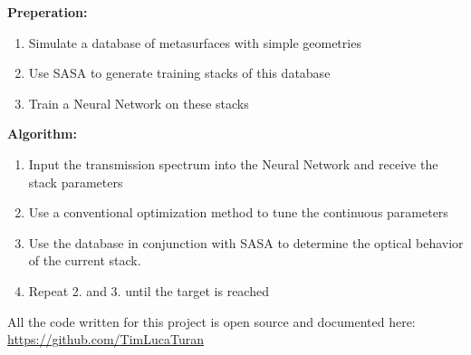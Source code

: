 \textbf{Preperation:}
\begin{enumerate}
    \item Simulate a database of metasurfaces with simple geometries

    \item Use SASA to generate training stacks of this database

    \item Train a Neural Network on these stacks
\end{enumerate}

\textbf{Algorithm:}
\begin{enumerate}
    \item Input the transmission spectrum into the Neural Network and receive the stack parameters

    \item Use a conventional optimization method to tune the continuous parameters

    \item Use the database in conjunction with SASA to determine the optical behavior of the current stack.

    \item Repeat 2. and 3. until the target is reached
\end{enumerate}

\vspace{1.5cm}

All the code written for this project is open source and documented here: \url{https://github.com/TimLucaTuran}

